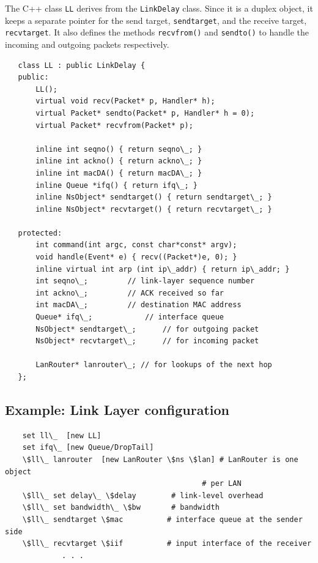 The C++ class {\tt LL} derives from the {\tt LinkDelay} class.  Since
it is a duplex object, it keeps a separate pointer for the send target,
{\tt sendtarget}, and the receive target, {\tt recvtarget}.  It also
defines the methods {\tt recvfrom()} and {\tt sendto()} to handle the
incoming and outgoing packets respectively.

\begin{verbatim}
   class LL : public LinkDelay {
   public:
   	   LL();
   	   virtual void recv(Packet* p, Handler* h);
   	   virtual Packet* sendto(Packet* p, Handler* h = 0);
   	   virtual Packet* recvfrom(Packet* p);
   
   	   inline int seqno() { return seqno\_; }
   	   inline int ackno() { return ackno\_; }
   	   inline int macDA() { return macDA\_; }
   	   inline Queue *ifq() { return ifq\_; }
   	   inline NsObject* sendtarget() { return sendtarget\_; }
   	   inline NsObject* recvtarget() { return recvtarget\_; }
   
   protected:
   	   int command(int argc, const char*const* argv);
   	   void handle(Event* e) { recv((Packet*)e, 0); }
   	   inline virtual int arp (int ip\_addr) { return ip\_addr; } 
   	   int seqno\_;			// link-layer sequence number
   	   int ackno\_;			// ACK received so far
   	   int macDA\_;			// destination MAC address
   	   Queue* ifq\_;			// interface queue
   	   NsObject* sendtarget\_;		// for outgoing packet 
   	   NsObject* recvtarget\_;		// for incoming packet
   
   	   LanRouter* lanrouter\_; // for lookups of the next hop
   };
\end{verbatim}

\subsection{Example: Link Layer configuration}
\label{ex:linklayer}

\begin{verbatim}
    set ll\_  [new LL]
    set ifq\_ [new Queue/DropTail]
    \$ll\_ lanrouter  [new LanRouter \$ns \$lan] # LanRouter is one object
                                             # per LAN
    \$ll\_ set delay\_ \$delay        # link-level overhead
    \$ll\_ set bandwidth\_ \$bw       # bandwidth
    \$ll\_ sendtarget \$mac          # interface queue at the sender side
    \$ll\_ recvtarget \$iif          # input interface of the receiver
             . . .
\end{verbatim}

